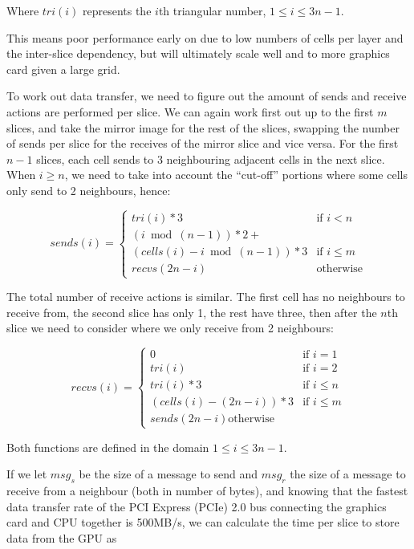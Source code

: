 \documentclass[conference]{IEEEtran}
\begin{document}
Where $ tri(i) $ represents the $i$th triangular number, $ 1 \le i \le 3n - 1 $. 

This means poor performance early on due to low numbers of cells per layer and the inter-slice dependency, but will ultimately scale well and to more graphics card given a large grid.

To work out data transfer, we need to figure out the amount of sends and receive actions are performed per slice. We can again work first out up to the first $ m $ slices, and take the mirror image for the rest of the slices, swapping the number of sends per slice for the receives of the mirror slice and vice versa. For the first $ n - 1 $ slices, each cell sends to 3 neighbouring adjacent cells in the next slice. When $ i \ge n $, we need to take into account the ``cut-off'' portions where some cells only send to 2 neighbours, hence:

\begin{equation}
sends(i) = \left\{
	\begin{array}{ll}
		tri(i) * 3 & \mbox{if } i < n \\
		(i\bmod(n - 1)) * 2 + \\
			(cells(i) - i\bmod(n - 1)) * 3 & \mbox{if } i \le m \\
		recvs(2n - i) & \mbox{otherwise}
	\end{array}
\right.
\end{equation}

The total number of receive actions is similar. The first cell has no neighbours to receive from, the second slice has only 1, the rest have three, then after the $n$th slice we need to consider where we only receive from 2 neighbours:

\begin{equation}
recvs(i) = \left\{
	\begin{array}{ll}
		0 & \mbox{if } i = 1 \\
		tri(i) & \mbox{if } i = 2 \\
		tri(i) * 3 & \mbox{if } i \le n \\
		(cells(i) - (2n - i)) * 3 & \mbox{if } i \le m \\
		sends(2n - i) \mbox{otherwise}
	\end{array}
\right.
\end{equation}

Both functions are defined in the domain $ 1 \le i \le 3n - 1 $.

If we let $ msg_s $ be the size of a message to send and $ msg_r $ the size of a message to receive from a neighbour (both in number of bytes), and knowing that the fastest data transfer rate of the PCI Express (PCIe) 2.0 bus connecting the graphics card and CPU together is 500MB/s\cite{PCIe}, we can calculate the time per slice to store data from the GPU as
\end{document}
